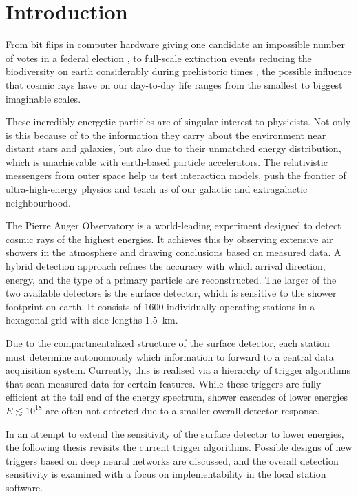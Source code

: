 
\chapter{Introduction}
\label{chap:introduction}


From bit flips in computer hardware giving one candidate an impossible number of votes in a federal election \cite{cosmicraybitshift}, to full-scale extinction 
events reducing the biodiversity on earth considerably during prehistoric times \cite{melott2004did, fields2020supernova}, the possible influence that cosmic rays
have on our day-to-day life ranges from the smallest to biggest imaginable scales.

These incredibly energetic particles are of singular interest to physicists. Not only is this because of to the information they carry about the environment near 
distant stars and galaxies, but also due to their unmatched energy distribution, which is unachievable with earth-based particle accelerators. The relativistic 
messengers from outer space help us test interaction models, push the frontier of ultra-high-energy physics and teach us of our galactic and extragalactic 
neighbourhood.

The Pierre Auger Observatory is a world-leading experiment designed to detect cosmic rays of the highest energies. It achieves this by observing extensive air 
showers in the atmosphere and drawing conclusions based on measured data. A hybrid detection approach refines the accuracy with which arrival direction, energy, 
and the type of a primary particle are reconstructed. The larger of the two available detectors is the surface detector, which is sensitive to the shower footprint
on earth. It consists of 1600 individually operating stations in a hexagonal grid with side lengths \SI{1.5}{\kilo\meter}.

Due to the compartmentalized structure of the surface detector, each station must determine autonomously which information to forward to a central data acquisition
system. Currently, this is realised via a hierarchy of trigger algorithms that scan measured data for certain features. While these triggers are fully efficient at
the tail end of the energy spectrum, shower cascades of lower energies $E \lesssim 10^{18}$ are often not detected due to a smaller overall detector response. 

In an attempt to extend the sensitivity of the surface detector to lower energies, the following thesis revisits the current trigger algorithms. Possible 
designs of new triggers based on deep neural networks are discussed, and the overall detection sensitivity is examined with a focus on implementability in the 
local station software.

